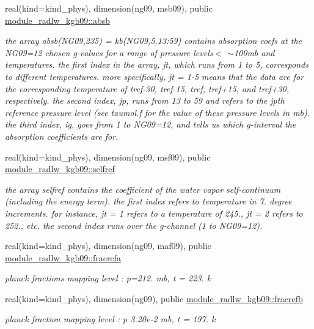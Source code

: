 \begin{Indent}
\begin{DoxyCompactItemize}
real(kind=kind\+\_\+phys), dimension(ng09, msb09), public \hyperlink{group__module__radlw__kgbnn_gadb2110a245d9f01b3fd1ab058c883003}{module\+\_\+radlw\+\_\+kgb09\+::absb}
\begin{DoxyCompactList}\small\item\em the array absb(\+N\+G09,235) = kb(\+N\+G09,5,13\+:59) contains absorption coefs at the N\+G09=12 chosen g-\/values for a range of pressure levels$<$ $\sim$100mb and temperatures. the first index in the array, jt, which runs from 1 to 5, corresponds to different temperatures. more specifically, jt = 1-\/5 means that the data are for the corresponding temperature of tref-\/30, tref-\/15, tref, tref+15, and tref+30, respectively. the second index, jp, runs from 13 to 59 and refers to the jpth reference pressure level (see taumol.\+f for the value of these pressure levels in mb). the third index, ig, goes from 1 to N\+G09=12, and tells us which g-\/interval the absorption coefficients are for. \end{DoxyCompactList}\item 
real(kind=kind\+\_\+phys), dimension(ng09, msf09), public \hyperlink{group__module__radlw__kgbnn_ga1c65e91a215060738292d0ca5a8f38a2}{module\+\_\+radlw\+\_\+kgb09\+::selfref}
\begin{DoxyCompactList}\small\item\em the array selfref contains the coefficient of the water vapor self-\/continuum (including the energy term). the first index refers to temperature in 7. degree increments. for instance, jt = 1 refers to a temperature of 245., jt = 2 refers to 252., etc. the second index runs over the g-\/channel (1 to N\+G09=12). \end{DoxyCompactList}\item 
real(kind=kind\+\_\+phys), dimension(ng09, maf09), public \hyperlink{group__module__radlw__kgbnn_gace3d3e2731609f7ea50eb798bd212f3b}{module\+\_\+radlw\+\_\+kgb09\+::fracrefa}
\begin{DoxyCompactList}\small\item\em planck fractions mapping level \+: p=212. mb, t = 223. k \end{DoxyCompactList}\item 
real(kind=kind\+\_\+phys), dimension(ng09), public \hyperlink{group__module__radlw__kgbnn_ga26476f00fe13c1c81d3ae0cf8e43c90b}{module\+\_\+radlw\+\_\+kgb09\+::fracrefb}
\begin{DoxyCompactList}\small\item\em planck fraction mapping level \+: p 3.\+20e-\/2 mb, t = 197. k \end{DoxyCompactList}\item 

\end{DoxyCompactItemize}
\end{Indent}
